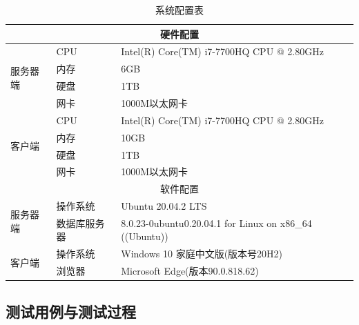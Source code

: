 \begin{table}[H]
  \centering
  \song\wuhao
  \caption{系统配置表}
  \begin{tabular}{|l|l|l|}
    \hline
    \multicolumn{3}{|c|}{硬件配置}                                                                     \\ \hline
    \multirow{4}{*}{服务器端} & CPU          & Intel(R) Core(TM) i7-7700HQ CPU @ 2.80GHz               \\ \cline{2-3}
                              & 内存         & 6GB                                                     \\ \cline{2-3}
                              & 硬盘         & 1TB                                                     \\ \cline{2-3}
                              & 网卡         & 1000M以太网卡                                           \\ \hline
    \multirow{4}{*}{客户端}   & CPU          & Intel(R) Core(TM) i7-7700HQ CPU @ 2.80GHz               \\ \cline{2-3}
                              & 内存         & 10GB                                                    \\ \cline{2-3}
                              & 硬盘         & 1TB                                                     \\ \cline{2-3}
                              & 网卡         & 1000M以太网卡                                           \\ \hline
    \multicolumn{3}{|c|}{软件配置}                                                                     \\ \hline
    \multirow{2}{*}{服务器端} & 操作系统     & Ubuntu 20.04.2 LTS                                      \\ \cline{2-3}
                              & 数据库服务器 & 8.0.23-0ubuntu0.20.04.1 for Linux on x86\_64 ((Ubuntu)) \\ \hline
    \multirow{2}{*}{客户端}   & 操作系统     & Windows 10 家庭中文版(版本号20H2)                       \\ \cline{2-3}
                              & 浏览器       & Microsoft Edge(版本90.0.818.62)                         \\ \hline
  \end{tabular}
\end{table}


\subsection{测试用例与测试过程}

